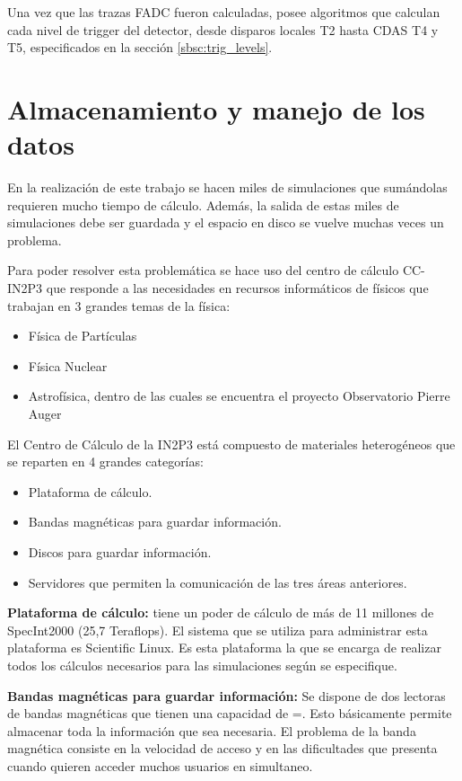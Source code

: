 		Una vez que las trazas FADC fueron calculadas, \Offline{} posee algoritmos que calculan cada nivel de trigger del detector, desde disparos locales T2 hasta CDAS T4 y T5, especificados en la secci\'on \ref{sbsc:trig_levels}.
		

	\section{Almacenamiento y manejo de los datos}
	
	En la realización de este trabajo se hacen miles de simulaciones que sumándolas requieren mucho tiempo de cálculo.
	Además, la salida de estas miles de simulaciones debe ser guardada y el espacio en disco se vuelve muchas veces un problema.
	
	Para poder resolver esta problemática se hace uso del centro de cálculo CC-IN2P3 que responde a las necesidades en recursos informáticos de físicos que trabajan en 3 grandes temas de la física:
	
	\begin{itemize}
	\item Física de Partículas
	\item Física Nuclear
	\item Astrofísica, dentro de las cuales se encuentra el proyecto Observatorio Pierre Auger
	\end{itemize}
	
	El Centro de Cálculo de la IN2P3 está compuesto de materiales heterogéneos que se reparten en 4 grandes categorías:
	
	\begin{itemize}
	\item Plataforma de cálculo.
	\item Bandas magnéticas para guardar información.
	\item Discos para guardar información.
	\item Servidores que permiten la comunicación de las tres áreas anteriores.
	\end{itemize}
	
	{\bf Plataforma de cálculo:} tiene un poder de cálculo de más de 11 millones de SpecInt2000 (25,7 Teraflops).
	El sistema que se utiliza para administrar esta plataforma es Scientific Linux.
	Es esta plataforma la que se encarga de realizar todos los cálculos necesarios para las simulaciones según se especifique.
	
	{\bf Bandas magnéticas para guardar información:} Se dispone de dos lectoras de bandas magnéticas que tienen una capacidad de =.
	Esto básicamente permite almacenar toda la información que sea necesaria.
	El problema de la banda magnética consiste en la velocidad de acceso y en las dificultades que presenta cuando quieren acceder muchos usuarios en simultaneo.
	
